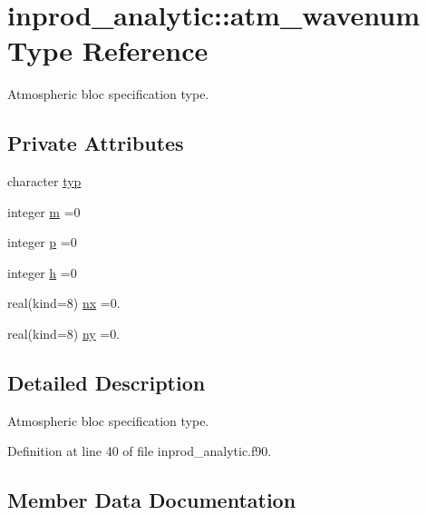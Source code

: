 \hypertarget{structinprod__analytic_1_1atm__wavenum}{}\section{inprod\+\_\+analytic\+:\+:atm\+\_\+wavenum Type Reference}
\label{structinprod__analytic_1_1atm__wavenum}


Atmospheric bloc specification type.  


\subsection*{Private Attributes}
\begin{DoxyCompactItemize}
\item 
character \hyperlink{structinprod__analytic_1_1atm__wavenum_a1c12be211e96c5a773aae4c2146a3792}{typ}
\item 
integer \hyperlink{structinprod__analytic_1_1atm__wavenum_a72be0a86c5f5801b88ebf78506523bd2}{m} =0
\item 
integer \hyperlink{structinprod__analytic_1_1atm__wavenum_a5a938641d8939931bc4eb71499298a6a}{p} =0
\item 
integer \hyperlink{structinprod__analytic_1_1atm__wavenum_aa7df1690e97e43365ca0c2b1222924b5}{h} =0
\item 
real(kind=8) \hyperlink{structinprod__analytic_1_1atm__wavenum_ad67bf9989f5524b1f97dc7211ef78db2}{nx} =0.
\item 
real(kind=8) \hyperlink{structinprod__analytic_1_1atm__wavenum_af75974631175c67689c588f6d92ceb3e}{ny} =0.
\end{DoxyCompactItemize}


\subsection{Detailed Description}
Atmospheric bloc specification type. 

Definition at line 40 of file inprod\+\_\+analytic.\+f90.



\subsection{Member Data Documentation}
